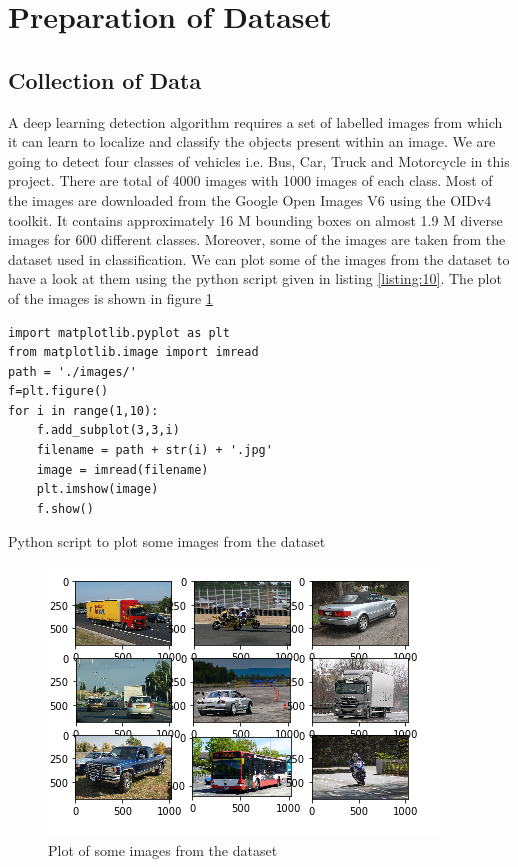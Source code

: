   \section{Preparation of Dataset}
  \subsection{Collection of Data}
  A deep learning  detection algorithm requires a set of labelled images from which it can learn to localize and classify the objects present within an image. We are going to detect four classes of vehicles i.e. Bus, Car, Truck and Motorcycle in this project. There are total of 4000 images with 1000 images of each class. Most of the images are downloaded from the Google Open Images V6 using the OIDv4 toolkit. It contains approximately 16 M bounding boxes on almost 1.9 M diverse images for 600 different classes. Moreover, some of the images are taken from the dataset used in classification. We can plot some of the images from the dataset to have a look at them using the python script given in listing \ref{listing:10}. The plot of the images is shown in figure \ref{fig:5.6}
\linespread{1.0}
\begin{longlisting}
\begin{verbatim}
import matplotlib.pyplot as plt
from matplotlib.image import imread
path = './images/'
f=plt.figure()
for i in range(1,10):
    f.add_subplot(3,3,i)
    filename = path + str(i) + '.jpg'
    image = imread(filename)
    plt.imshow(image)   
    f.show()
\end{verbatim}
\caption{Python script to plot some images from the dataset}
\label{listing:10}
\end{longlisting}
\begin{figure}[H]
\centering
\captionsetup{justification = centering}
\includegraphics[scale= 1]{CHAPTERS/Chapter-5/images/5.6.PNG}
 \caption{Plot of some images from the dataset } 
 \label{fig:5.6}
 \end{figure}
